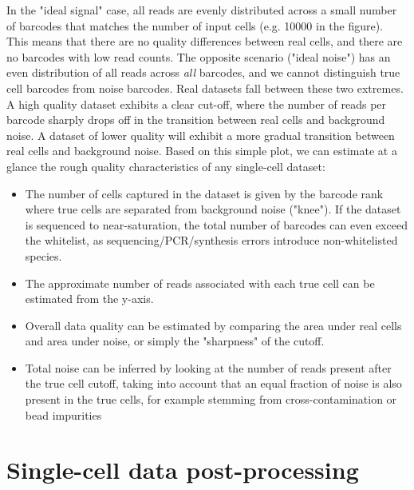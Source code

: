 In the "ideal signal" case, all reads are evenly distributed across a small number of barcodes that matches the number of input cells (e.g. \num{10000} in the figure). This means that there are no quality differences between real cells, and there are no barcodes with low read counts. The opposite scenario ("ideal noise") has an even distribution of all reads across \textit{all} barcodes, and we cannot distinguish true cell barcodes from noise barcodes. Real datasets fall between these two extremes. A high quality dataset exhibits a clear cut-off, where the number of reads per barcode sharply drops off in the transition between real cells and background noise. A dataset of lower quality will exhibit a more gradual transition between real cells and background noise. Based on this simple plot, we can estimate at a glance the rough quality characteristics of any single-cell dataset:

\begin{itemize}[noitemsep]
	\item The number of cells captured in the dataset is given by the barcode rank where true cells are separated from background noise ("knee"). If the dataset is sequenced to near-saturation, the total number of barcodes can even exceed the whitelist, as sequencing/PCR/synthesis errors introduce non-whitelisted species.
	\item The approximate number of reads associated with each true cell can be estimated from the y-axis.
	\item Overall data quality can be estimated by comparing the area under real cells and area under noise, or simply the "sharpness" of the cutoff.
	\item Total noise can be inferred by looking at the number of reads present after the true cell cutoff, taking into account that an equal fraction of noise is also present in the true cells, for example stemming from cross-contamination or bead impurities
\end{itemize}

\section{Single-cell data post-processing}

